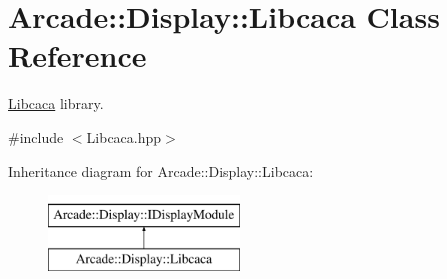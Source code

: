\hypertarget{classArcade_1_1Display_1_1Libcaca}{}\section{Arcade\+::Display\+::Libcaca Class Reference}
\label{classArcade_1_1Display_1_1Libcaca}


\mbox{\hyperlink{classArcade_1_1Display_1_1Libcaca}{Libcaca}} library.  




{\ttfamily \#include $<$Libcaca.\+hpp$>$}

Inheritance diagram for Arcade\+::Display\+::Libcaca\+:\begin{figure}[H]
\begin{center}
\leavevmode
\includegraphics[height=2.000000cm]{classArcade_1_1Display_1_1Libcaca}
\end{center}
\end{figure}
